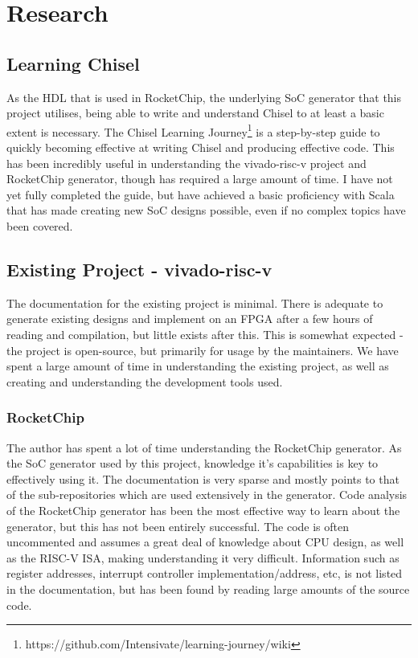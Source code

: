 \section{Research}
\label{sec:background}
\subsection{Learning Chisel}
As the HDL that is used in RocketChip\cite{rocketchip}, the underlying SoC generator that this project utilises, being able to write and understand Chisel to at least a basic extent is necessary. The Chisel Learning Journey\footnote{https://github.com/Intensivate/learning-journey/wiki} is a step-by-step guide to quickly becoming effective at writing Chisel and producing effective code. This has been incredibly useful in understanding the vivado-risc-v\cite{vivado-risc-v} project and RocketChip generator, though has required a large amount of time. I have not yet fully completed the guide, but have achieved a basic proficiency with Scala that has made creating new SoC designs possible, even if no complex topics have been covered.

\subsection{Existing Project - vivado-risc-v\cite{vivado-risc-v}}
The documentation for the existing project is minimal. There is adequate to generate existing designs and implement on an FPGA after a few hours of reading and compilation, but little exists after this. This is somewhat expected - the project is open-source, but primarily for usage by the maintainers. We have spent a large amount of time in understanding the existing project, as well as creating and understanding the development tools used.

\subsubsection{RocketChip}
The author has spent a lot of time understanding the RocketChip generator\cite{rocketchip}. As the SoC generator used by this project, knowledge it's capabilities is key to effectively using it. The documentation is very sparse and mostly points to that of the sub-repositories which are used extensively in the generator. Code analysis of the RocketChip generator has been the most effective way to learn about the generator, but this has not been entirely successful. The code is often uncommented and assumes a great deal of knowledge about CPU design, as well as the RISC-V ISA, making understanding it very difficult. Information such as register addresses, interrupt controller implementation/address, etc, is not listed in the documentation, but has been found by reading large amounts of the source code. 

